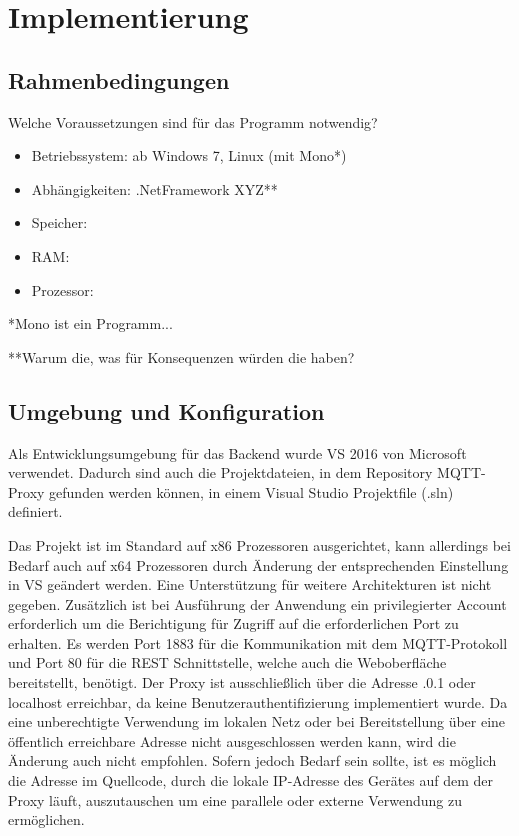 \chapter{Implementierung}
\section{Rahmenbedingungen}
    Welche Voraussetzungen sind für das Programm notwendig?
    \begin{itemize}
        \item Betriebssystem: ab Windows 7, Linux (mit Mono*)
        \item Abhängigkeiten: .NetFramework XYZ**
        \item Speicher: 
        \item RAM: 
        \item Prozessor: 
    \end{itemize}
    
    *Mono ist ein Programm...
    
    **Warum die, was für Konsequenzen würden die haben?

\section{Umgebung und Konfiguration} %
    Als Entwicklungsumgebung für das Backend wurde \ac{VS} 2016 \cite{JohnsonBruce2018Pvs2}
    von Microsoft verwendet. Dadurch sind auch die Projektdateien, in dem Repository \glqq MQTT-Proxy\grqq{} \cite{eisenschmidt_2019}
    gefunden werden können, in einem Visual Studio Projektfile (.sln) definiert.
    
    Das Projekt ist im Standard auf x86 Prozessoren ausgerichtet, kann allerdings bei Bedarf auch auf x64 Prozessoren durch Änderung der entsprechenden Einstellung in \ac{VS} geändert werden.
    Eine Unterstützung für weitere Architekturen ist nicht gegeben.
    Zusätzlich ist bei Ausführung der Anwendung ein privilegierter Account erforderlich um die Berichtigung für Zugriff auf die erforderlichen Port zu erhalten.
    Es werden Port 1883 für die Kommunikation mit dem \ac{MQTT}-Protokoll und Port 80 für die \ac{REST} Schnittstelle, welche auch die Weboberfläche bereitstellt, benötigt.
    Der Proxy ist ausschließlich über die Adresse .0.1\grqq{} oder \glqq localhost\grqq{} erreichbar, da keine Benutzerauthentifizierung implementiert wurde. Da eine unberechtigte Verwendung im lokalen Netz oder bei Bereitstellung über eine öffentlich erreichbare Adresse nicht ausgeschlossen werden kann, wird die Änderung auch nicht empfohlen. Sofern jedoch Bedarf sein sollte, ist es möglich die Adresse im Quellcode, durch die lokale IP-Adresse des Gerätes auf dem der Proxy läuft, auszutauschen um eine parallele oder externe Verwendung zu ermöglichen.
    

